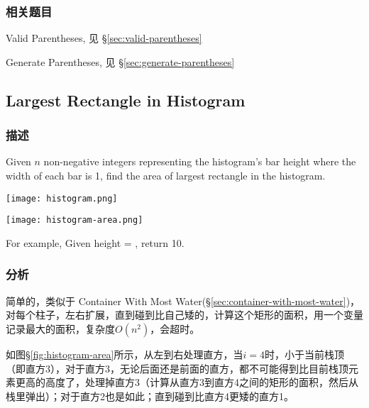 \subsubsection{相关题目}
\begindot
\item Valid Parentheses, 见 \S \ref{sec:valid-parentheses}
\item Generate Parentheses, 见 \S \ref{sec:generate-parentheses}
\myenddot


\subsection{Largest Rectangle in Histogram} %
\label{sec:largest-rectangle-in-histogram}


\subsubsection{描述}
Given $n$ non-negative integers representing the histogram's bar height where the width of each bar is 1, find the area of largest rectangle in the histogram.

\begin{center}
\texttt{[image: histogram.png]}\\
\label{fig:histogram}
\end{center}

\begin{center}
\texttt{[image: histogram-area.png]}\\
\label{fig:histogram-area}
\end{center}

For example,
Given height = \fn{[2,1,5,6,2,3]},
return 10.


\subsubsection{分析}
简单的，类似于 Container With Most Water(\S \ref{sec:container-with-most-water})，对每个柱子，左右扩展，直到碰到比自己矮的，计算这个矩形的面积，用一个变量记录最大的面积，复杂度$O(n^2)$，会超时。

如图\S \ref{fig:histogram-area}所示，从左到右处理直方，当$i=4$时，小于当前栈顶（即直方3），对于直方3，无论后面还是前面的直方，都不可能得到比目前栈顶元素更高的高度了，处理掉直方3（计算从直方3到直方4之间的矩形的面积，然后从栈里弹出）；对于直方2也是如此；直到碰到比直方4更矮的直方1。

